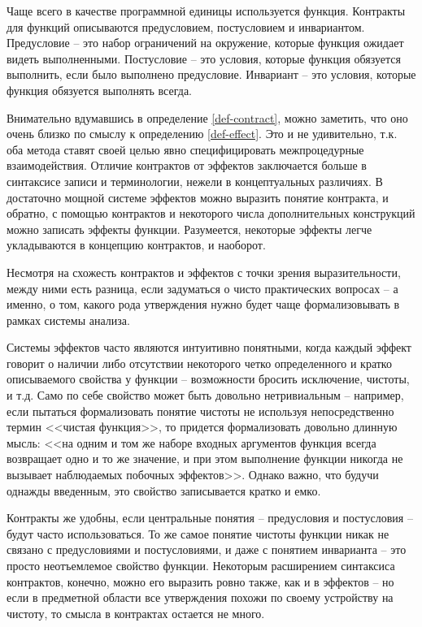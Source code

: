 Чаще всего в качестве программной единицы используется функция. Контракты для функций описываются предусловием, постусловием и инвариантом. Предусловие -- это набор ограничений на окружение, которые функция ожидает видеть выполненными. Постусловие -- это условия, которые функция обязуется выполнить, если было выполнено предусловие. Инвариант -- это условия, которые функция обязуется выполнять всегда.

Внимательно вдумавшись в определение \ref{def-contract}, можно заметить, что оно очень близко по смыслу к определению \ref{def-effect}. Это и не удивительно, т.к. оба метода ставят своей целью явно специфицировать межпроцедурные взаимодействия.  Отличие контрактов от эффектов заключается больше в синтаксисе записи и терминологии, нежели в концептуальных различиях. В достаточно мощной системе эффектов можно выразить понятие контракта, и обратно, с помощью контрактов и некоторого числа дополнительных конструкций можно записать эффекты функции. Разумеется, некоторые эффекты легче укладываются в концепцию контрактов, и наоборот.

Несмотря на схожесть контрактов и эффектов с точки зрения выразительности, между ними есть разница, если задуматься о чисто практических вопросах -- а именно, о том, какого рода утверждения нужно будет чаще формализовывать в рамках системы анализа.

Системы эффектов часто являются интуитивно понятными, когда каждый эффект говорит о наличии либо отсутствии некоторого четко определенного и кратко описываемого свойства у функции -- возможности бросить исключение, чистоты, и т.д. Само по себе свойство может быть довольно нетривиальным -- например, если пытаться формализовать понятие чистоты не используя непосредственно термин <<чистая функция>>, то придется формализовать довольно длинную мысль: <<на одним и том же наборе входных аргументов функция всегда возвращает одно и то же значение, и при этом выполнение функции никогда не вызывает наблюдаемых побочных эффектов>>. Однако важно, что будучи однажды введенным, это свойство записывается кратко и емко.

Контракты же удобны, если центральные понятия -- предусловия и постусловия -- будут часто использоваться. То же самое понятие чистоты функции никак не связано с предусловиями и постусловиями, и даже с понятием инварианта -- это просто неотъемлемое свойство функции. Некоторым расширением синтаксиса контрактов, конечно, можно его выразить ровно также, как и в эффектов -- но если в предметной области все утверждения похожи по своему устройству на чистоту, то смысла в контрактах остается не много.

